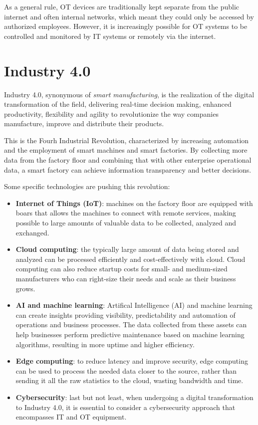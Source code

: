 As a general rule, OT devices are traditionally kept separate from the public internet and often internal networks, which meant they could only be accessed by authorized employees. However, it is increasingly possible for OT systems to be controlled and monitored by IT systems or remotely via the internet.~\cite{it-vs-ot-cybersecurity}

\section{Industry 4.0}

Industry 4.0, synonymous of \textit{smart manufacturing}, is the realization of the digital transformation of the field, delivering real-time decision making, enhanced productivity, flexibility and agility to revolutionize the way companies manufacture, improve and distribute their products.  

This is the Fourh Industrial Revolution, characterized by increasing automation and the employment of smart machines and smart factories. By collecting more data from the factory floor and combining that with other enterprise operational data, a smart factory can achieve information transparency and better decisions.

Some specific technologies are pushing this revolution:~\cite{what-is-industry-4-0}
\begin{itemize}
  \item \textbf{Internet of Things (IoT)}: machines on the factory floor are equipped with boars that allows the machines to connect with remote services, making possible to large amounts of valuable data to be collected, analyzed and exchanged.
  \item \textbf{Cloud computing}: the typically large amount of data being stored and analyzed can be processed efficiently and cost-effectively with cloud. Cloud computing can also reduce startup costs for small- and medium-sized manufacturers who can right-size their needs and scale as their business grows.
  \item \textbf{AI and machine learning}: Artifical Intelligence (AI) and machine learning can create insights providing visibility, predictability and automation of operations and business processes. The data collected from these assets can help businesses perform predictive maintenance based on machine learning algorithms, resulting in more uptime and higher efficiency.
  \item \textbf{Edge computing}: to reduce latency and improve security, edge computing can be used to process the needed data closer to the source, rather than sending it all the raw statistics to the cloud, wasting bandwidth and time.
  \item \textbf{Cybersecurity}: last but not least, when undergoing a digital transformation to Industry 4.0, it is essential to consider a cybersecurity approach that encompasses IT and OT equipment.
\end{itemize}

